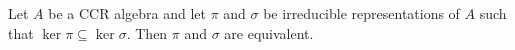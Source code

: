 Let $A$ be a CCR algebra and let $\pi$ and $\sigma$ be irreducible representations of $A$ such that $\ker\pi \subseteq \ker\sigma$. Then $\pi$ and $\sigma$ are equivalent.
